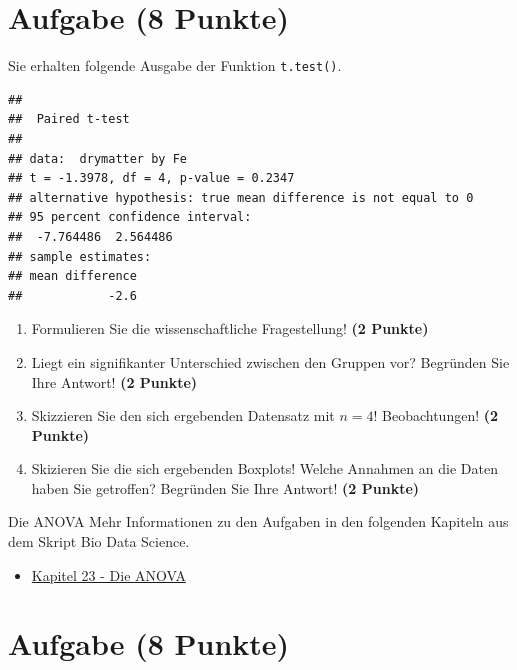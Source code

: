 \documentclass[a4paper, 10pt]{scrartcl}\usepackage[]{graphicx}\usepackage[]{xcolor}
\makeatletter
\newenvironment{kframe}{%
 \def\at@end@of@kframe{}%
 \ifinner\ifhmode%
  \def\at@end@of@kframe{\end{minipage}}%
  \begin{minipage}{\columnwidth}%
 \fi\fi%
 \def\FrameCommand##1{\hskip\@totalleftmargin \hskip-\fboxsep
 \colorbox{shadecolor}{##1}\hskip-\fboxsep
     \hskip-\linewidth \hskip-\@totalleftmargin \hskip\columnwidth}%
 \MakeFramed {\advance\hsize-\width
   \@totalleftmargin\z@ \linewidth\hsize
   \@setminipage}}%
 {\par\unskip\endMakeFramed%
 \at@end@of@kframe}
\newenvironment{knitrout}{}{} %
\makeatother
\begin{document}
\section{Aufgabe \hfill (8 Punkte)}

Sie erhalten folgende \Rlogo Ausgabe der Funktion \texttt{t.test()}.

\begin{knitrout}
\color{fgcolor}\begin{kframe}
\begin{verbatim}
## 
## 	Paired t-test
## 
## data:  drymatter by Fe
## t = -1.3978, df = 4, p-value = 0.2347
## alternative hypothesis: true mean difference is not equal to 0
## 95 percent confidence interval:
##  -7.764486  2.564486
## sample estimates:
## mean difference 
##            -2.6
\end{verbatim}
\end{kframe}
\end{knitrout}


\begin{enumerate}
  \item Formulieren Sie die wissenschaftliche Fragestellung! \textbf{(2
Punkte)}
\item Liegt ein signifikanter Unterschied zwischen den Gruppen vor?
  Begr{\"u}nden Sie Ihre Antwort! \textbf{(2 Punkte)}
\item Skizzieren Sie den sich ergebenden Datensatz mit $n = 4$! Beobachtungen! \textbf{(2 Punkte)} 
\item Skizieren Sie die sich ergebenden Boxplots! Welche Annahmen an die Daten haben Sie getroffen? Begr{\"u}nden Sie Ihre Antwort! \textbf{(2 Punkte)} 
\end{enumerate}
 
\clearpage
\begin{graybox}{Die ANOVA}
Mehr Informationen zu den Aufgaben in den folgenden Kapiteln aus dem Skript Bio Data Science.
  \begin{itemize}
  \item \href{https://jkruppa.github.io/stat-tests-anova.html}{Kapitel 23 - Die ANOVA}
  \end{itemize}
\end{graybox}

\section{Aufgabe \hfill (8 Punkte)}
\end{document}

